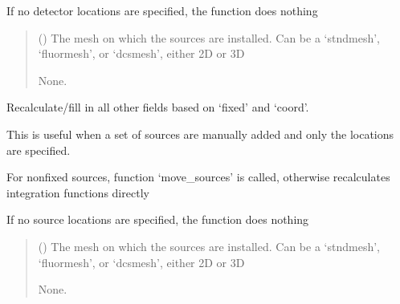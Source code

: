 \documentclass[letterpaper,10pt,english]{sphinxmanual}
\begin{document}
\begin{fulllineitems}
\begin{fulllineitems}
\sphinxAtStartPar
If no detector locations are specified, the function does nothing
\begin{quote}\begin{description}
\sphinxAtStartPar
{} () \textendash{} The mesh on which the sources are installed. Can be a ‘stndmesh’, ‘fluormesh’, or ‘dcsmesh’, either 2D or 3D

\sphinxAtStartPar
None.

\end{description}\end{quote}

\end{fulllineitems}


\begin{fulllineitems}
\label{\detokenize{_autosummary/nirfasterff.base.optodes.optode:nirfasterff.base.optodes.optode.touch_sources}}
\pysigstartsignatures
\pysiglinewithargsret
{}
{}
{}
\pysigstopsignatures
\sphinxAtStartPar
Recalculate/fill in all other fields based on ‘fixed’ and ‘coord’.

\sphinxAtStartPar
This is useful when a set of sources are manually added and only the locations are specified.

\sphinxAtStartPar
For non\sphinxhyphen{}fixed sources, function ‘move\_sources’ is called, otherwise recalculates integration functions directly

\sphinxAtStartPar
If no source locations are specified, the function does nothing
\begin{quote}\begin{description}
\sphinxAtStartPar
{} () \textendash{} The mesh on which the sources are installed. Can be a ‘stndmesh’, ‘fluormesh’, or ‘dcsmesh’, either 2D or 3D

\sphinxAtStartPar
None.

\end{description}\end{quote}

\end{fulllineitems}


\end{fulllineitems}
\end{document}
